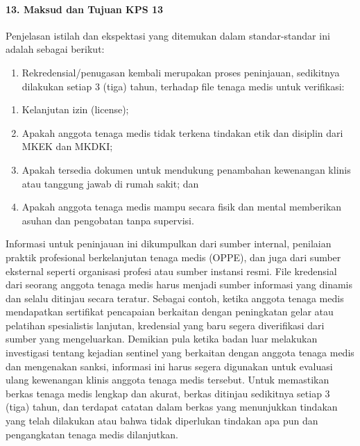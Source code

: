 \documentclass[
]{book}
\providecommand{\tightlist}{%
  \setlength{\itemsep}{0pt}\setlength{\parskip}{0pt}}
\begin{document}
\hypertarget{maksud-dan-tujuan-kps-13}{%
\paragraph*{13. Maksud dan Tujuan KPS 13}\label{maksud-dan-tujuan-kps-13}}

Penjelasan istilah dan ekspektasi yang ditemukan dalam standar-standar ini adalah sebagai berikut:

\begin{enumerate}
\def\labelenumi{\alph{enumi}.}
\tightlist
\item
  Rekredensial/penugasan kembali merupakan proses peninjauan, sedikitnya dilakukan setiap 3 (tiga) tahun, terhadap file tenaga medis untuk verifikasi:
\end{enumerate}

\begin{enumerate}
\def\labelenumi{\arabic{enumi}.}
\tightlist
\item
  Kelanjutan izin (license);
\item
  Apakah anggota tenaga medis tidak terkena tindakan etik dan disiplin dari MKEK dan MKDKI;
\item
  Apakah tersedia dokumen untuk mendukung penambahan kewenangan klinis atau tanggung jawab di rumah sakit; dan
\item
  Apakah anggota tenaga medis mampu secara fisik dan mental memberikan asuhan dan pengobatan tanpa supervisi.
\end{enumerate}

Informasi untuk peninjauan ini dikumpulkan dari sumber internal, penilaian praktik profesional berkelanjutan tenaga medis (OPPE), dan juga dari sumber eksternal seperti organisasi profesi atau sumber instansi resmi.
File kredensial dari seorang anggota tenaga medis harus menjadi sumber informasi yang dinamis dan selalu ditinjau secara teratur. Sebagai contoh, ketika anggota tenaga medis mendapatkan sertifikat pencapaian berkaitan dengan peningkatan gelar atau pelatihan spesialistis lanjutan, kredensial yang baru segera diverifikasi dari sumber yang mengeluarkan. Demikian pula ketika badan luar melakukan investigasi tentang kejadian sentinel yang berkaitan dengan anggota tenaga medis dan mengenakan sanksi, informasi ini harus segera digunakan untuk evaluasi ulang kewenangan klinis anggota tenaga medis tersebut. Untuk memastikan berkas tenaga medis lengkap dan akurat, berkas ditinjau sedikitnya setiap 3 (tiga) tahun, dan terdapat catatan dalam berkas yang menunjukkan tindakan yang telah dilakukan atau bahwa tidak diperlukan tindakan apa pun dan pengangkatan tenaga medis dilanjutkan.
\end{document}
